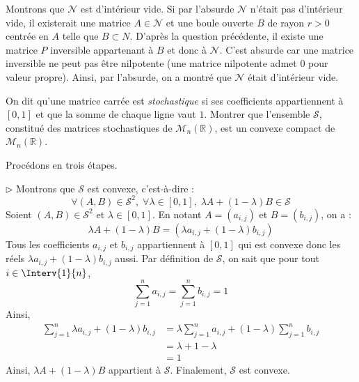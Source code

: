 \documentclass[a4paper,10pt]{report}
\begin{document}
\begin{enumerate}
\begin{enumerate}
\medskip

\noindent Montrons que $\mathcal{N}$ est d'intérieur vide. Si par l'absurde $\mathcal{N}$ n'était pas d'intérieur vide, il existerait une matrice $A \in \mathcal{N}$ et une boule ouverte $B$ de rayon $r>0$ centrée en $A$ telle que $B \subset N$. D'après la question précédente, il existe une matrice $P$ inversible appartenant à $B$ et donc à $\mathcal{N}$. C'est absurde car une matrice inversible ne peut pas être nilpotente (une matrice nilpotente admet $0$ pour valeur propre). Ainsi, par l'absurde, on a montré que $\mathcal{N}$ était d'intérieur vide.
\end{enumerate}
\end{enumerate}


\begin{Exercice}{} On dit qu'une matrice carrée est \textit{stochastique} si ses coefficients appartiennent à $[0,1]$ et que la somme de chaque ligne vaut $1$. Montrer que l'ensemble $\mathcal{S}$, constitué des matrices stochastiques de $\mathcal{M}_n(\mathbb{R})$, est un convexe compact de $\mathcal{M}_n(\mathbb{R})$.
\end{Exercice} 

\corr Procédons en trois étapes.

\medskip

\noindent $\rhd$ Montrons que $\mathcal{S}$ est convexe, c'est-à-dire :
$$ \forall (A,B) \in \mathcal{S}^2, \; \forall \lambda \in [0,1], \; \lambda A+(1-\lambda)B \in \mathcal{S}$$
Soient $(A,B) \in \mathcal{S}^2$ et $\lambda \in [0,1]$. En notant $A=(a_{i,j})$ et $B=(b_{i,j})$, on a :
$$ \lambda A+ (1- \lambda) B = (\lambda a_{i,j} + (1- \lambda) b_{i,j})$$
Tous les coefficients $a_{i,j}$ et $ b_{i,j}$ appartiennent à $[0,1]$ qui est convexe donc les réels $\lambda a_{i,j} + (1- \lambda) b_{i,j}$ aussi. Par définition de $\mathcal{S}$, on sait que pour tout $i \in \Interv{1}{n}$,
$$ \sum_{j=1}^n a_{i,j} = \sum_{j=1}^n b_{i,j} = 1$$
Ainsi,
\begin{align*}
\sum_{j=1}^n \lambda a_{i,j} + (1 - \lambda) b_{i,j} & = \lambda   \sum_{j=1}^n a_{i,j} + (1 - \lambda)  \sum_{j=1}^n b_{i,j}  \\
& = \lambda + 1- \lambda \\
& = 1
\end{align*}
Ainsi, $\lambda A+ (1- \lambda)B$ appartient à $\mathcal{S}$. Finalement, $\mathcal{S}$ est convexe.

\medskip
\end{document}
